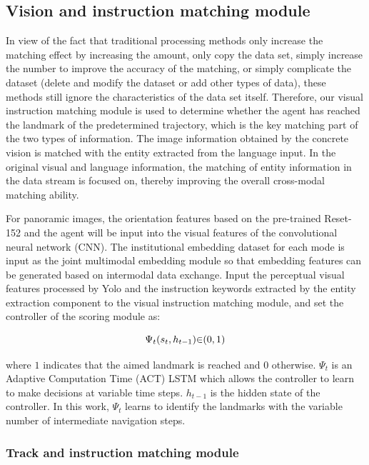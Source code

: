 \subsection{Vision and instruction matching module}
	
In view of the fact that traditional processing methods only increase the matching effect by increasing the amount, only copy the data set, simply increase the number to improve the accuracy of the matching, or simply complicate the dataset (delete and modify the dataset or add other types of data), these methods still ignore the characteristics of the data set itself. Therefore, our visual instruction matching module is used to determine whether the agent has reached the landmark of the predetermined trajectory, which is the key matching part of the two types of information. The image information obtained by the concrete vision is matched with the entity extracted from the language input. In the original visual and language information, the matching of entity information in the data stream is focused on, thereby improving the overall cross-modal matching ability.
	
For panoramic images, the orientation features based on the pre-trained Reset-152 and the agent will be input into the visual features of the convolutional neural network (CNN). The institutional embedding dataset for each mode is input as the joint multimodal embedding module so that embedding features can be generated based on intermodal data exchange. Input the perceptual visual features processed by Yolo and the instruction keywords extracted by the entity extraction component to the visual instruction matching module, and set the controller of the scoring module as:

\begin{equation}
	\centering
	{\Psi}_{t}({s}_{t},{h}_{t-1}){\in}{({0},{1})}
\end{equation}

where ${1}$ indicates that the aimed landmark is reached and ${0}$ otherwise. ${{\Psi}_{t}}$ is an Adaptive Computation Time (ACT) LSTM which allows the controller to learn to make decisions at variable time steps. ${h}_{t-1}$ is the hidden state of the controller. In this work, ${{\Psi}_{t}}$ learns to identify the landmarks with the variable number of intermediate navigation steps.

\subsubsection{Track and instruction matching module}

